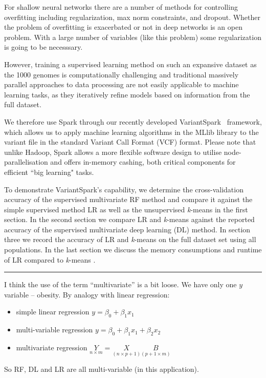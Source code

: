 \documentclass{llncs}
\newcommand{\variantSpark}{{\sc VariantSpark}}
\newcommand{\kMeans}{\textit{k}-means }
\begin{document}
{For shallow neural networks there are a number of methods for controlling overfitting including regularization, max norm
constraints, and dropout. Whether the problem of overfitting is exacerbated or not in deep networks is an open problem.
With a large number of variables (like this problem) some regularization is going to be necesssary. 

However, training a supervised learning method on such an expansive dataset as the 1000 genomes is computationally 
challenging and traditional massively parallel approaches to data processing are not easily applicable to machine learning 
tasks, as they iteratively refine models based on information from the full dataset.

We therefore use {\sc Spark} through our recently developed \variantSpark~\cite{OBrien} framework, which allows us to
apply machine learning algorithms in the {\sc MLlib} library to the variant file in the standard Variant Call Format (VCF) format.  Please note
that unlike {\sc Hadoop}, {\sc Spark} allows a more flexible software design to utilise node-parallelisation and offers
in-memory cashing, both critical components for efficient ``big learning" tasks.

To demonstrate \variantSpark's capability, we determine the cross-validation accuracy of the supervised multivariate RF
method and compare it against the simple supervised method LR as well as the unsupervised \kMeans{} in the first
section.  In the second section we compare LR and \kMeans{} against the reported accuracy of the supervised multivariate
deep learning (DL) method.  In section three we record the accuracy of LR and \kMeans{} on the full dataset set using all populations.
In the last section we discuss the memory consumptions and runtime of LR compared to \kMeans{}.

\clearpage
\hrule
I think the use of the term ``multivariate'' is a bit loose. We have only one $y$ variable -- obesity. By analogy with linear regression:
\begin{itemize}
\item simple linear regression $y=\beta_0 + \beta_1x_1$
\item multi-variable regression $y=\beta_0 + \beta_1x_1 + \beta_2 x_2$
\item multivariate regression $\underset{n\times m}{Y}= \underset{(n\times p+1)}{X} \underset{(p+1 \times m)}{B}$
\end{itemize}
So RF, DL and LR are all multi-variable (in this application). 

}
\end{document}
